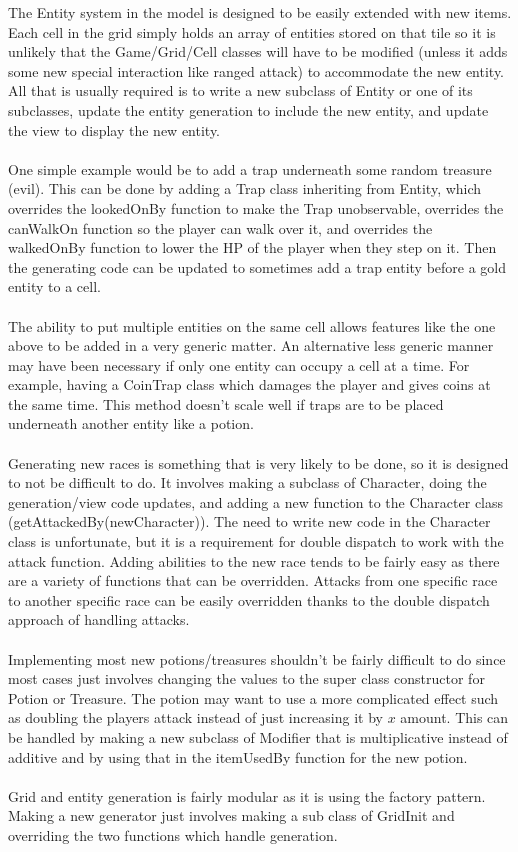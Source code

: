 \documentclass[12pt]{article}
\begin{document}
The Entity system in the model is designed to be easily extended with new items. Each cell in the grid simply holds an array of entities stored on that tile so it is unlikely that the Game/Grid/Cell classes will have to be modified (unless it adds some new special interaction like ranged attack) to accommodate the new entity. All that is usually required is to write a new subclass of Entity or one of its subclasses, update the entity generation to include the new entity, and update the view to display the new entity.\\
\\
One simple example would be to add a trap underneath some random treasure (evil). This can be done by adding a Trap class inheriting from Entity, which overrides the lookedOnBy function to make the Trap unobservable, overrides the canWalkOn function so the player can walk over it, and overrides the walkedOnBy function to lower the HP of the player when they step on it. Then the generating code can be updated to sometimes add a trap entity before a gold entity to a cell.\\
\\
The ability to put multiple entities on the same cell allows features like the one above to be added in a very generic matter. An alternative less generic manner may have been necessary if only one entity can occupy a cell at a time. For example, having a CoinTrap class which damages the player and gives coins at the same time. This method doesn't scale well if traps are to be placed underneath another entity like a potion.\\
\\
Generating new races is something that is very likely to be done, so it is designed to not be difficult to do. It involves making a subclass of Character, doing the generation/view code updates, and adding a new function to the Character class (getAttackedBy(newCharacter)). The need to write new code in the Character class is unfortunate, but it is a requirement for double dispatch to work with the attack function. Adding abilities to the new race tends to be fairly easy as there are a variety of functions that can be overridden. Attacks from one specific race to another specific race can be easily overridden thanks to the double dispatch approach of handling attacks.\\
\\
Implementing most new potions/treasures shouldn't be fairly difficult to do since most cases just involves changing the values to the super class constructor for Potion or Treasure. The potion may want to use a more complicated effect such as doubling the players attack instead of just increasing it by $x$ amount. This can be handled by making a new subclass of Modifier that is multiplicative instead of additive and by using that in the itemUsedBy function for the new potion.\\
\\
Grid and entity generation is fairly modular as it is using the factory pattern. Making a new generator just involves making a sub class of GridInit and overriding the two functions which handle generation.
\end{document}
